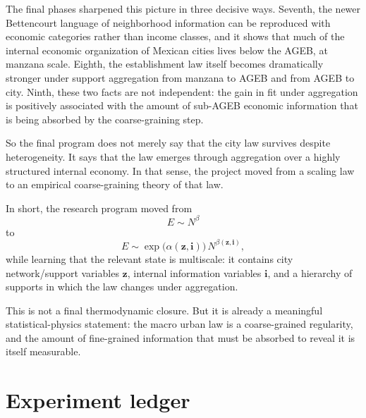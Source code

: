 \documentclass[11pt]{article}
\begin{document}
The final phases sharpened this picture in three decisive ways. Seventh, the newer Bettencourt language of neighborhood information can be reproduced with economic categories rather than income classes, and it shows that much of the internal economic organization of Mexican cities lives below the AGEB, at manzana scale. Eighth, the establishment law itself becomes dramatically stronger under support aggregation from manzana to AGEB and from AGEB to city. Ninth, these two facts are not independent: the gain in fit under aggregation is positively associated with the amount of sub-AGEB economic information that is being absorbed by the coarse-graining step.

So the final program does not merely say that the city law survives despite heterogeneity. It says that the law emerges through aggregation over a highly structured internal economy. In that sense, the project moved from a scaling law to an empirical coarse-graining theory of that law.

In short, the research program moved from
\begin{equation}
E \sim N^\beta
\end{equation}
to
\begin{equation}
E \sim \exp\!\bigl(\alpha(\mathbf{z},\mathbf{i})\bigr)\,N^{\beta(\mathbf{z},\mathbf{i})},
\end{equation}
while learning that the relevant state is multiscale: it contains city network/support variables \(\mathbf{z}\), internal information variables \(\mathbf{i}\), and a hierarchy of supports in which the law changes under aggregation.

This is not a final thermodynamic closure. But it is already a meaningful statistical-physics statement: the macro urban law is a coarse-grained regularity, and the amount of fine-grained information that must be absorbed to reveal it is itself measurable.

\appendix

\section{Experiment ledger}
\end{document}
